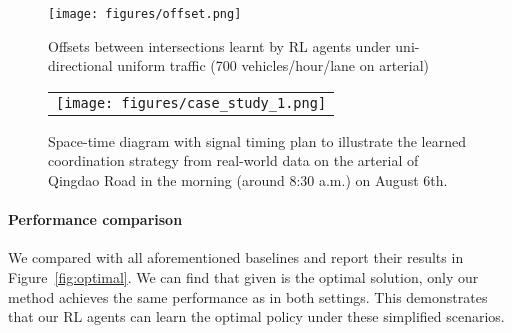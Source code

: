 \begin{figure}[t!]
  \centering
	\texttt{[image: figures/offset.png]}
     \caption{Offsets between intersections learnt by RL agents under uni-directional uniform traffic (700 vehicles/hour/lane on arterial) }   
    \label{fig:case-study}
    \vspace{-3mm}
\end{figure}

\begin{figure}[t!]
  \centering
  \begin{tabular}{c}
   \texttt{[image: figures/case\_study\_1.png]} \\
   \end{tabular}
     \caption{Space-time diagram with signal timing plan to illustrate the learned coordination strategy from real-world data on the arterial of Qingdao Road in the morning (around 8:30 a.m.) on August 6th.}
    \label{fig:case-study-real}
    \vspace{-3mm}
\end{figure}

\paragraph{Performance comparison}
We compared \PressLight with all aforementioned baselines and report their results in Figure~\ref{fig:optimal}. We can find that given \Greenwave is the optimal solution, only our method \PressLight achieves the same performance as \Greenwave in both settings. This demonstrates that our RL agents can learn the optimal policy under these simplified scenarios.



